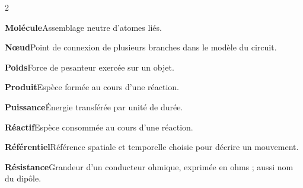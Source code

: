 \begin{multicols}{2}
\par\addvspace{2mm}\noindent\begin{minipage}{\linewidth}\textbf{Molécule}\enspace Assemblage neutre d’atomes liés.\par\end{minipage}\par
\par\addvspace{2mm}\noindent\begin{minipage}{\linewidth}\textbf{Nœud}\enspace Point de connexion de plusieurs branches dans le modèle du circuit.\par\end{minipage}\par
\par\addvspace{2mm}\noindent\begin{minipage}{\linewidth}\textbf{Poids}\enspace Force de pesanteur exercée sur un objet.\par\end{minipage}\par
\par\addvspace{2mm}\noindent\begin{minipage}{\linewidth}\textbf{Produit}\enspace Espèce formée au cours d’une réaction.\par\end{minipage}\par
\par\addvspace{2mm}\noindent\begin{minipage}{\linewidth}\textbf{Puissance}\enspace Énergie transférée par unité de durée.\par\end{minipage}\par
\par\addvspace{2mm}\noindent\begin{minipage}{\linewidth}\textbf{Réactif}\enspace Espèce consommée au cours d’une réaction.\par\end{minipage}\par
\par\addvspace{2mm}\noindent\begin{minipage}{\linewidth}\textbf{Référentiel}\enspace Référence spatiale et temporelle choisie pour décrire un mouvement.\par\end{minipage}\par
\par\addvspace{2mm}\noindent\begin{minipage}{\linewidth}\textbf{Résistance}\enspace Grandeur d’un conducteur ohmique, exprimée en ohms ; aussi nom du dipôle.\par\end{minipage}\par

\end{multicols}

